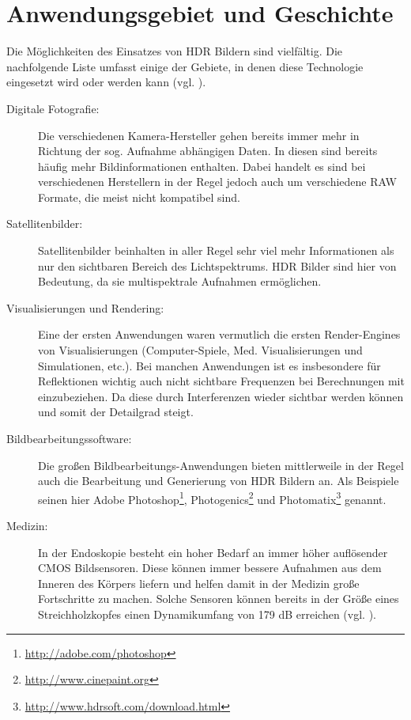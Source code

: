 
\section{Anwendungsgebiet und Geschichte}

Die Möglichkeiten des Einsatzes von \gls{HDR} Bildern sind vielfältig. Die nachfolgende Liste umfasst einige der Gebiete, in denen diese Technologie eingesetzt wird oder werden kann (vgl. \cite[S.~87f]{Reinhard}).

\begin{description}

\item[Digitale Fotografie:] Die verschiedenen Kamera-Hersteller gehen bereits immer mehr in Richtung der sog. Aufnahme abhängigen Daten. In diesen sind bereits häufig mehr Bildinformationen enthalten. Dabei handelt es sind bei verschiedenen Herstellern in der Regel jedoch auch um verschiedene \gls{RAW} Formate, die meist nicht kompatibel sind. 

\item[Satellitenbilder:] Satellitenbilder beinhalten in aller Regel sehr viel mehr Informationen als nur den sichtbaren Bereich des Lichtspektrums. \gls{HDR} Bilder sind hier von Bedeutung, da sie multispektrale Aufnahmen ermöglichen.

\item[Visualisierungen und Rendering:] Eine der ersten Anwendungen waren vermutlich die ersten Render-Engines von Visualisierungen (Computer-Spiele, Med. Visualisierungen und Simulationen, etc.). Bei manchen Anwendungen ist es insbesondere für Reflektionen wichtig auch nicht sichtbare Frequenzen bei Berechnungen mit einzubeziehen. Da diese durch Interferenzen wieder sichtbar werden können und somit der Detailgrad steigt.

\item[Bildbearbeitungssoftware:] Die großen Bildbearbeitungs-Anwendungen bieten mittlerweile in der Regel auch die Bearbeitung und Generierung von \gls{HDR} Bildern an. Als Beispiele seinen hier Adobe Photoshop\footnote{\url{http://adobe.com/photoshop}}, Photogenics\footnote{\url{http://www.cinepaint.org}} und Photomatix\footnote{\url{http://www.hdrsoft.com/download.html}} genannt.

\item[Medizin:] In der Endoskopie besteht ein hoher Bedarf an immer höher auflösender \gls{CMOS} Bildsensoren. Diese können immer bessere Aufnahmen aus dem Inneren des Körpers liefern und helfen damit in der Medizin große Fortschritte zu machen. Solche Sensoren können bereits in der Größe eines Streichholzkopfes einen Dynamikumfang von 179 dB erreichen (vgl. \cite{Klingler_Richter_Strobel_2006}).


\end{description}
